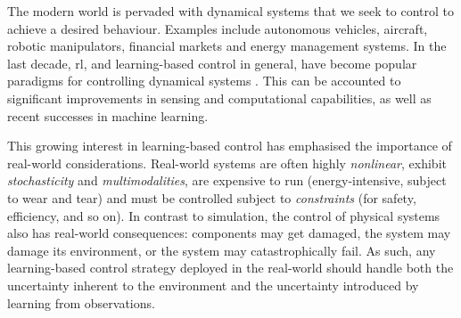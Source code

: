 \documentclass{mimosis-class/mimosis}
\numberwithin{equation}{chapter}
\newcommand{\modeInd}{\ensuremath{k}}
\newcommand{\state}{\ensuremath{\mathbf{x}}}
\newcommand{\control}{\ensuremath{\mathbf{u}}}
\newcommand{\modeVar}{\ensuremath{\alpha}}
\begin{document}
\newcommand{\stateDiff}{\ensuremath{\Delta \state}}

\renewcommand{\stateCostMatrix}{\ensuremath{\mathbf{Q}}}
\renewcommand{\controlCostMatrix}{\ensuremath{\mathbf{R}}}
\renewcommand{\terminalStateCostMatrix}{\ensuremath{\mathbf{H}}}
\renewcommand{\approxExpectedCost}{\ensuremath{J(\stateTraj, \controlTraj)}}

\renewcommand{\terminalState}{\ensuremath{\state_{\TimeInd}}}

\newcommand{\stateMean}{\ensuremath{\bm\mu_{\state_\timeInd}}}
\newcommand{\stateCov}{\ensuremath{\bm\Sigma_{\state_\timeInd}}}
\newcommand{\terminalStateMean}{\ensuremath{\bm\mu_{\state_\TimeInd}}}
\newcommand{\terminalStateCov}{\ensuremath{\bm\Sigma_{\state_\TimeInd}}}
\newcommand{\controlMean}{\ensuremath{\bm\mu_{\control_\timeInd}}}
\newcommand{\controlCov}{\ensuremath{\bm\Sigma_{\control_\timeInd}}}
\newcommand{\stateDiff}{\ensuremath{\Delta \state}}
\newcommand{\stateDiffMean}{\ensuremath{\bm\mu_{\stateDiff_\timeInd}}}
\newcommand{\stateDiffCov}{\ensuremath{\bm\Sigma_{\stateDiff_\timeInd}}}

\renewcommand{\transitionDistK}{\ensuremath{p(\state_{\timeInd+1} \mid \state_\timeInd, \control_\timeInd, \modeVar_{\timeInd}=\modeInd)}}
The modern world is pervaded with dynamical systems that we seek to control to achieve a desired behaviour.
Examples include autonomous vehicles, aircraft, robotic manipulators, financial markets and energy management systems.
In the last decade, \acrfull{rl}, and learning-based
control in general, have become
popular paradigms for controlling dynamical systems \citep{hewingLearningBased2020,sutton2018reinforcement}.
This can be accounted to significant improvements in sensing and computational capabilities, as well as
recent successes in machine learning.

This growing interest in learning-based control
has emphasised the importance of real-world considerations.
Real-world systems are often highly \emph{nonlinear}, exhibit \emph{stochasticity} and \emph{multimodalities},
are expensive to run (energy-intensive, subject to wear and tear) and
must be controlled subject to \emph{constraints} (for safety, efficiency, and so on).
In contrast to simulation, the control of physical systems also has real-world consequences:
components may get damaged, the system may damage its environment, or the system may catastrophically fail.
As such, any learning-based control strategy deployed in the real-world should handle both the uncertainty inherent
to the environment and the uncertainty introduced by learning from observations.
\end{document}
